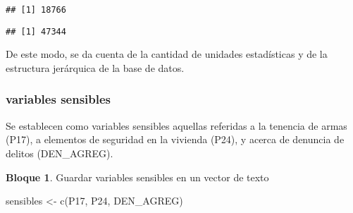 \documentclass[
]{book}
\newenvironment{Shaded}{\begin{snugshade}}{\end{snugshade}}
\newcommand{\FunctionTok}[1]{\textcolor[rgb]{0.00,0.00,0.00}{#1}}
\newcommand{\NormalTok}[1]{#1}
\newcommand{\OtherTok}[1]{\textcolor[rgb]{0.56,0.35,0.01}{#1}}
\newcommand{\SpecialCharTok}[1]{\textcolor[rgb]{0.00,0.00,0.00}{#1}}
\newcommand{\StringTok}[1]{\textcolor[rgb]{0.31,0.60,0.02}{#1}}
\theoremstyle{definition}
\theoremstyle{definition}
\newtheorem{example}{Bloque}[chapter]
\theoremstyle{definition}
\theoremstyle{definition}
\theoremstyle{remark}
\begin{document}
\begin{Shaded}
\end{Shaded}

\begin{verbatim}
## [1] 18766
\end{verbatim}

\begin{Shaded}
\end{Shaded}

\begin{verbatim}
## [1] 47344
\end{verbatim}

De este modo, se da cuenta de la cantidad de unidades estadísticas y de la estructura jerárquica de la base de datos.

\hypertarget{variables-sensibles}{%
\subsubsection{variables sensibles}\label{variables-sensibles}}

Se establecen como variables sensibles aquellas referidas a la tenencia de armas (P17), a elementos de seguridad en la vivienda (P24), y acerca de denuncia de delitos (DEN\_AGREG).

\begin{example}
\protect\hypertarget{exm:bloque7nbm}{}\label{exm:bloque7nbm}Guardar variables sensibles en un vector de texto
\end{example}

\begin{Shaded}
\begin{Highlighting}[]
\NormalTok{sensibles }\OtherTok{\textless{}{-}} \FunctionTok{c}\NormalTok{(}\StringTok{\textquotesingle{}P17\textquotesingle{}}\NormalTok{,}
               \StringTok{\textquotesingle{}P24\textquotesingle{}}\NormalTok{,}
               \StringTok{\textquotesingle{}DEN\_AGREG\textquotesingle{}}\NormalTok{)}
\end{Highlighting}
\end{Shaded}
\end{document}
